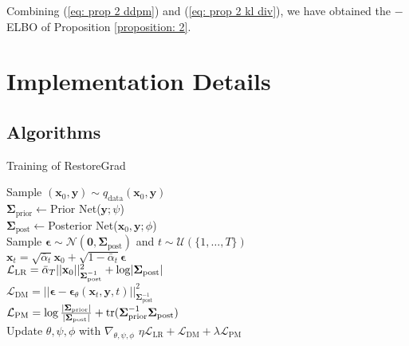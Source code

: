 Combining (\ref{eq: prop 2 ddpm}) and (\ref{eq: prop 2 kl div}), we have obtained the $-$ELBO of Proposition \ref{proposition: 2}.



\section{Implementation Details}
\label{sec: appendix exp}

\subsection{Algorithms}
\label{sec: algorithms}
\begin{minipage}{0.53\textwidth}
\begin{algorithm}[H]
    \footnotesize
    \caption{Training of RestoreGrad}
    {
        Sample $(\mathbf{x}_0,\mathbf{y})\sim q_{\text{data}}(\mathbf{x}_0,\mathbf{y})$ \\
        $\boldsymbol{\Sigma}_{\text{prior}}\gets$Prior Net($\mathbf{y};\psi$) \\
        $\boldsymbol{\Sigma}_{\text{post}}\gets$Posterior Net($\mathbf{x}_0,\mathbf{y};\phi$) \\
        Sample $\boldsymbol{\epsilon}\sim \mathcal{N}(\mathbf{0},\boldsymbol{\Sigma}_{\text{post}})$ and $t\sim \mathcal{U}(\{1,\dots,T\})$ \\
        $\mathbf{x}_t=\sqrt{\bar{\alpha}_t}\mathbf{x}_0+\sqrt{1-\bar{\alpha}_t}\boldsymbol{\epsilon}$ \\
        $\mathcal{L}_{\text{LR}}=\bar{\alpha}_T||\mathbf{x}_0||^2_{\boldsymbol{\Sigma}^{-1}_{\text{post}}}+\log\lvert\boldsymbol{\Sigma}_{\text{post}}\rvert$ \\
        $\mathcal{L}_{\text{DM}}=||\boldsymbol{\epsilon}-\boldsymbol{\epsilon}_\theta(\mathbf{x}_t,\mathbf{y},t)||^2_{\boldsymbol{\Sigma}^{-1}_{\text{post}}}$ \\
        $\mathcal{L}_{\text{PM}}=\log\frac{\lvert\boldsymbol{\Sigma}_{\text{prior}}\rvert}{\lvert\boldsymbol{\Sigma}_{\text{post}}\rvert}+\text{tr}(\boldsymbol{\Sigma}_{\text{prior}}^{-1}\boldsymbol{\Sigma}_{\text{post}})$ \\
        Update $\theta,\psi,\phi$ with $\nabla_{\theta,\psi,\phi} \,\, \eta\mathcal{L}_{\text{LR}}+\mathcal{L}_{\text{DM}}+\lambda\mathcal{L}_{\text{PM}}$ 
    }
\label{algo: training}
\end{algorithm}
\end{minipage}
\hfill

